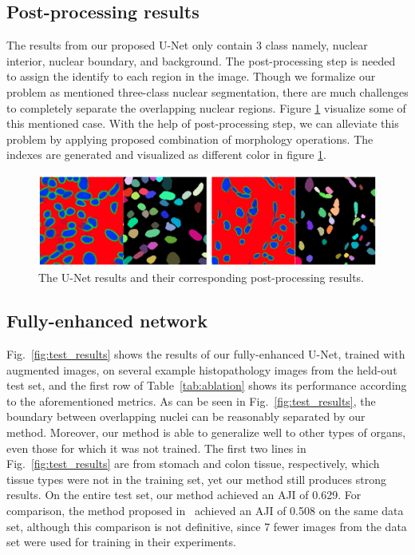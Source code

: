 \subsection{Post-processing results}

The results from our proposed U-Net only contain 3 class namely, nuclear interior, nuclear boundary, and background. The post-processing step is needed to assign the identify to each region in the image. Though we formalize our problem as mentioned three-class nuclear segmentation, there are much challenges to completely separate the overlapping nuclear regions. Figure \ref{fig:pose_process} visualize some of this mentioned case. With the help of post-processing step, we can alleviate this problem by applying proposed combination of morphology operations. The indexes are generated and visualized as different color in figure \ref{fig:pose_process}.

\begin{figure}[thb]
    \centering
    \includegraphics[width=\textwidth]{resources/5_post_processing.png}
    \caption{The U-Net results and their corresponding post-processing results.}
    \label{fig:pose_process}
\end{figure}

\subsection{Fully-enhanced network}
Fig.~\ref{fig:test_results} shows the results of our fully-enhanced U-Net, trained with augmented images, on several example histopathology images from the held-out test set, and the first row of Table~\ref{tab:ablation} shows its performance according to the aforementioned metrics.
As can be seen in Fig.~\ref{fig:test_results}, the boundary between overlapping nuclei can be reasonably separated by our method.
Moreover, our method is able to generalize well to other types of organs, even those for which it was not trained.
The first two lines in Fig.~\ref{fig:test_results} are from stomach and colon tissue, respectively, which tissue types were not in the training set,
yet our method still produces strong results. 
On the entire test set, our method achieved an AJI of 0.629.
For comparison, the method proposed in~\cite{he_dataset_kumar} achieved an AJI of 0.508 on the same data set, although this comparison is not definitive, since 7 fewer images from the data set were used for training in their experiments.

